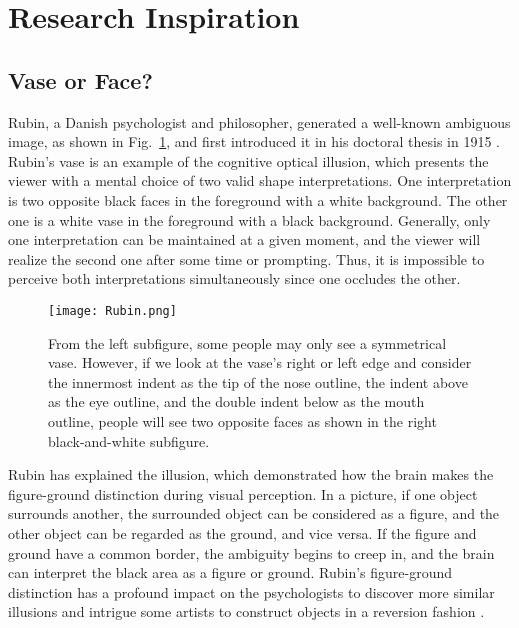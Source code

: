 \section{Research Inspiration}


\subsection{Vase or Face?}


Rubin, a Danish psychologist and philosopher, generated a well-known
ambiguous image, as shown in Fig.~\ref{fig:rubin_vase}, and first
introduced it in his doctoral thesis in 1915
\cite{rubin1915synsoplevede}. Rubin's vase is an example of the
cognitive optical illusion, which presents the viewer with a mental
choice of two valid shape interpretations. One interpretation is two
opposite black faces in the foreground with a white background. The
other one is a white vase in the foreground with a black
background. Generally, only one interpretation can be maintained at a
given moment, and the viewer will realize the second one after some
time or prompting. Thus, it is impossible to perceive both
interpretations simultaneously since one occludes the other.


   \begin{figure}
      \centering
      \texttt{[image: Rubin.png]}
      \caption{From the left subfigure, some people may only see a
        symmetrical vase. However, if we look at the vase's right or
        left edge and consider the innermost indent as the tip of the
        nose outline, the indent above as the eye outline, and the
        double indent below as the mouth outline, people will see two
        opposite faces as shown in the right black-and-white
        subfigure.}
      \label{fig:rubin_vase}
   \end{figure}


Rubin has explained the illusion, which demonstrated how the brain
makes the figure-ground distinction during visual perception. In a
picture, if one object surrounds another, the surrounded object can be
considered as a figure, and the other object can be regarded as the
ground, and vice versa. If the figure and ground have a common border,
the ambiguity begins to creep in, and the brain can interpret the
black area as a figure or ground. Rubin's figure-ground distinction
has a profound impact on the psychologists to discover more similar
illusions \cite{mather2006foundations} and intrigue some artists to
construct objects in a reversion fashion \cite{bool1982mc}.


